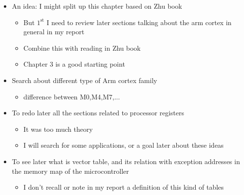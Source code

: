 \begin{itemize} %

\item An idea: I might split up this chapter based on Zhu book

	\begin{itemize}
	\item But $\mathrm{1}^\mathrm{st}$ I need to review later sections talking about the arm cortex in general in my report
	
	\item Combine this with reading in Zhu book
	
	\item Chapter 3 is a good starting point 	
	
	\end{itemize}


\item Search about different type of Arm cortex family

	\begin{itemize}
	\item difference between M0,M4,M7,...
	\end{itemize}

\item To redo later all the sections related to processor registers

	\begin{itemize}
	\item It was too much theory
	
	\item I will search for some applications, or a goal later about these ideas 
	\end{itemize}


\item To see later what is vector table, and its relation with exception addresses in the memory map of the microcontroller

	\begin{itemize}
	\item I don't recall or note in my report a definition of this kind of tables
	\end{itemize}

\end{itemize} %



